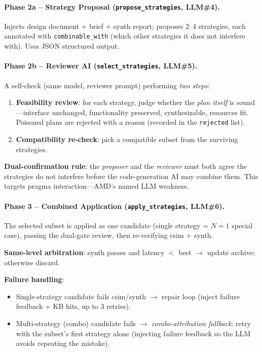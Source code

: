 \documentclass[10pt,conference,letterpaper]{IEEEtran}
\begin{document}
\paragraph{Phase 2a -- Strategy Proposal (\texttt{propose\_strategies}, LLM\#4).}
Injects design document + brief + synth report; proposes 2--4 strategies, each annotated with \texttt{combinable\_with} (which other strategies it does not interfere with). Uses JSON structured output.

\paragraph{Phase 2b -- Reviewer AI (\texttt{select\_strategies}, LLM\#5).}
A self-check (same model, reviewer prompt) performing \emph{two steps}:
\begin{enumerate}
    \item \textbf{Feasibility review}: for each strategy, judge whether the \emph{plan itself} is sound---interface unchanged, functionality preserved, synthesizable, resources fit. Poisoned plans are rejected with a reason (recorded in the \texttt{rejected} list).
    \item \textbf{Compatibility re-check}: pick a compatible subset from the surviving strategies.
\end{enumerate}
\textbf{Dual-confirmation rule}: the \emph{proposer} and the \emph{reviewer} must both agree the strategies do not interfere before the code-generation AI may combine them. This targets pragma interaction---AMD's named LLM weakness.

\paragraph{Phase 3 -- Combined Application (\texttt{apply\_strategies}, LLM\#6).}
The selected subset is applied as one candidate (single strategy = $N{=}1$ special case), passing the dual-gate review, then re-verifying csim + synth.

\textbf{Same-level arbitration}: synth passes and latency $<$ best $\to$ update archive; otherwise discard.

\textbf{Failure handling}:
\begin{itemize}
    \item Single-strategy candidate fails csim/synth $\to$ repair loop (inject failure feedback + KB hits, up to 3 retries).
    \item Multi-strategy (combo) candidate fails $\to$ \emph{combo-attribution fallback}: retry with the subset's first strategy alone (injecting failure feedback so the LLM avoids repeating the mistake).
\end{itemize}
\end{document}
